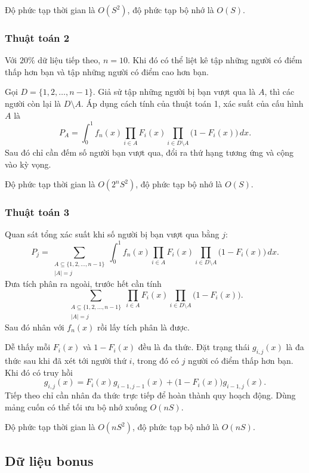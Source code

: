 \documentclass[11pt]{article}
\begin{document}
Độ phức tạp thời gian là \(O(S^2)\), độ phức tạp bộ nhớ là \(O(S)\).

\subsubsection{Thuật toán 2}

Với \(20\%\) dữ liệu tiếp theo, \(n=10\). Khi đó có thể liệt kê tập những người
có điểm thấp hơn bạn và tập những người có điểm cao hơn bạn.

Gọi \(D=\{1,2,\ldots,n-1\}\). Giả sử tập những người bị bạn vượt qua là \(A\),
thì các người còn lại là \(D\setminus A\). Áp dụng cách tính của thuật toán 1,
xác suất của cấu hình \(A\) là
\[
  P_A=\int_0^1 f_n(x)
  \prod_{i\in A}F_i(x)
  \prod_{i\in D\setminus A}\bigl(1-F_i(x)\bigr)\,dx. \tag{6}
\]
Sau đó chỉ cần đếm số người bạn vượt qua, đổi ra thứ hạng tương ứng và cộng vào
kỳ vọng.

Độ phức tạp thời gian là \(O(2^nS^2)\), độ phức tạp bộ nhớ là \(O(S)\).

\subsubsection{Thuật toán 3}

Quan sát tổng xác suất khi số người bị bạn vượt qua bằng \(j\):
\[
  P_j=
  \sum_{\substack{A\subseteq \{1,2,\ldots,n-1\}\\ |A|=j}}
  \int_0^1 f_n(x)
  \prod_{i\in A}F_i(x)
  \prod_{i\in D\setminus A}\bigl(1-F_i(x)\bigr)\,dx. \tag{7}
\]
Đưa tích phân ra ngoài, trước hết cần tính
\[
  \sum_{\substack{A\subseteq \{1,2,\ldots,n-1\}\\ |A|=j}}
  \prod_{i\in A}F_i(x)
  \prod_{i\in D\setminus A}\bigl(1-F_i(x)\bigr). \tag{8}
\]
Sau đó nhân với \(f_n(x)\) rồi lấy tích phân là được.

Dễ thấy mỗi \(F_i(x)\) và \(1-F_i(x)\) đều là đa thức. Đặt trạng thái
\(g_{i,j}(x)\) là đa thức sau khi đã xét tới người thứ \(i\), trong đó có \(j\)
người có điểm thấp hơn bạn. Khi đó có truy hồi
\[
  g_{i,j}(x)=F_i(x)g_{i-1,j-1}(x)
  +\bigl(1-F_i(x)\bigr)g_{i-1,j}(x). \tag{9}
\]
Tiếp theo chỉ cần nhân đa thức trực tiếp để hoàn thành quy hoạch động. Dùng mảng
cuốn có thể tối ưu bộ nhớ xuống \(O(nS)\).

Độ phức tạp thời gian là \(O(nS^2)\), độ phức tạp bộ nhớ là \(O(nS)\).

\subsection{Dữ liệu bonus}
\end{document}
